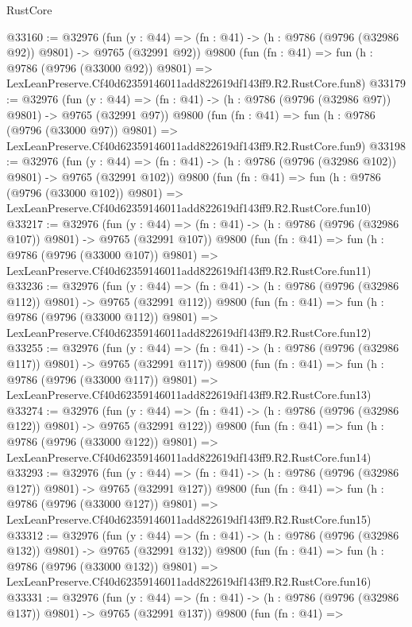 \begin{lexlean}{RustCore}
\begin{coremodule}
@33160 := @32976
    (fun (y : @44) => (fn : @41) -> (h : @9786 (@9796 (@32986 @92)) @9801) -> @9765 (@32991 @92))
    @9800
    (fun (fn : @41) =>
    fun (h : @9786 (@9796 (@33000 @92)) @9801) =>
    LexLeanPreserve.Cf40d62359146011add822619df143ff9.R2.RustCore.fun8)
@33179 := @32976
    (fun (y : @44) => (fn : @41) -> (h : @9786 (@9796 (@32986 @97)) @9801) -> @9765 (@32991 @97))
    @9800
    (fun (fn : @41) =>
    fun (h : @9786 (@9796 (@33000 @97)) @9801) =>
    LexLeanPreserve.Cf40d62359146011add822619df143ff9.R2.RustCore.fun9)
@33198 := @32976
    (fun (y : @44) => (fn : @41) -> (h : @9786 (@9796 (@32986 @102)) @9801) -> @9765 (@32991 @102))
    @9800
    (fun (fn : @41) =>
    fun (h : @9786 (@9796 (@33000 @102)) @9801) =>
    LexLeanPreserve.Cf40d62359146011add822619df143ff9.R2.RustCore.fun10)
@33217 := @32976
    (fun (y : @44) => (fn : @41) -> (h : @9786 (@9796 (@32986 @107)) @9801) -> @9765 (@32991 @107))
    @9800
    (fun (fn : @41) =>
    fun (h : @9786 (@9796 (@33000 @107)) @9801) =>
    LexLeanPreserve.Cf40d62359146011add822619df143ff9.R2.RustCore.fun11)
@33236 := @32976
    (fun (y : @44) => (fn : @41) -> (h : @9786 (@9796 (@32986 @112)) @9801) -> @9765 (@32991 @112))
    @9800
    (fun (fn : @41) =>
    fun (h : @9786 (@9796 (@33000 @112)) @9801) =>
    LexLeanPreserve.Cf40d62359146011add822619df143ff9.R2.RustCore.fun12)
@33255 := @32976
    (fun (y : @44) => (fn : @41) -> (h : @9786 (@9796 (@32986 @117)) @9801) -> @9765 (@32991 @117))
    @9800
    (fun (fn : @41) =>
    fun (h : @9786 (@9796 (@33000 @117)) @9801) =>
    LexLeanPreserve.Cf40d62359146011add822619df143ff9.R2.RustCore.fun13)
@33274 := @32976
    (fun (y : @44) => (fn : @41) -> (h : @9786 (@9796 (@32986 @122)) @9801) -> @9765 (@32991 @122))
    @9800
    (fun (fn : @41) =>
    fun (h : @9786 (@9796 (@33000 @122)) @9801) =>
    LexLeanPreserve.Cf40d62359146011add822619df143ff9.R2.RustCore.fun14)
@33293 := @32976
    (fun (y : @44) => (fn : @41) -> (h : @9786 (@9796 (@32986 @127)) @9801) -> @9765 (@32991 @127))
    @9800
    (fun (fn : @41) =>
    fun (h : @9786 (@9796 (@33000 @127)) @9801) =>
    LexLeanPreserve.Cf40d62359146011add822619df143ff9.R2.RustCore.fun15)
@33312 := @32976
    (fun (y : @44) => (fn : @41) -> (h : @9786 (@9796 (@32986 @132)) @9801) -> @9765 (@32991 @132))
    @9800
    (fun (fn : @41) =>
    fun (h : @9786 (@9796 (@33000 @132)) @9801) =>
    LexLeanPreserve.Cf40d62359146011add822619df143ff9.R2.RustCore.fun16)
@33331 := @32976
    (fun (y : @44) => (fn : @41) -> (h : @9786 (@9796 (@32986 @137)) @9801) -> @9765 (@32991 @137))
    @9800
    (fun (fn : @41) =>

\end{coremodule}
\end{lexlean}
